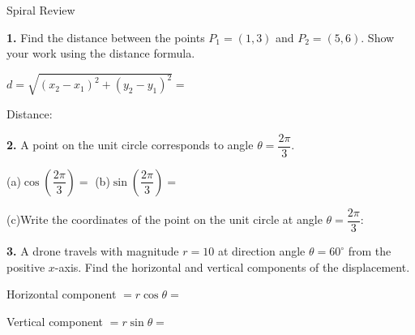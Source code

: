 \documentclass[10pt]{article}
\begin{document}
\namedateperiod

\vspace{0.12in}

\begin{notesbox}{Spiral Review}
\small

\textbf{1.} Find the distance between the points $P_1 = (1, 3)$ and $P_2 = (5, 6)$.
Show your work using the distance formula.

\vspace{0.08in}
\hspace{1em} $d = \sqrt{(x_2 - x_1)^2 + (y_2 - y_1)^2} = $

\vspace{0.12in}
\hspace{1em} Distance: 

\vspace{0.22in}

\textbf{2.} A point on the unit circle corresponds to angle $\theta = \dfrac{2\pi}{3}$.

\vspace{0.08in}
\hspace{1em} (a)\quad $\cos\!\left(\dfrac{2\pi}{3}\right) = $ 
\qquad
(b)\quad $\sin\!\left(\dfrac{2\pi}{3}\right) = $ 

\vspace{0.18in}
\hspace{1em} (c)\quad Write the coordinates of the point on the unit circle at
angle $\theta = \dfrac{2\pi}{3}$: 

\vspace{0.22in}

\textbf{3.} A drone travels with magnitude $r = 10$ at direction angle
$\theta = 60^\circ$ from the positive $x$-axis.
Find the horizontal and vertical components of the displacement.

\vspace{0.08in}
\hspace{1em} Horizontal component $= r\cos\theta = $

\vspace{0.1in}
\hspace{1em} Vertical component $= r\sin\theta = $

\end{notesbox}
\end{document}
